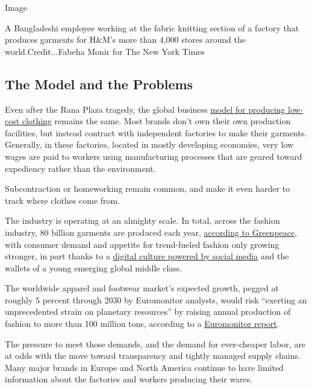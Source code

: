 Image

A Bangladeshi employee working at the fabric knitting section of a
factory that produces garments for H\&M's more than 4,000 stores around
the world.Credit...Fabeha Monir for The New York Times

\hypertarget{the-model-and-the-problems}{%
\subsection{The Model and the
Problems}\label{the-model-and-the-problems}}

Even after the Rana Plaza tragedy, the global business
\href{https://www.nytimes.com/2018/04/24/style/survivors-of-rana-plaza-disaster.html}{model
for producing low-cost clothing} remains the same. Most brands don't own
their own production facilities, but instead contract with independent
factories to make their garments. Generally, in these factories, located
in mostly developing economies, very low wages are paid to workers using
manufacturing processes that are geared toward expediency rather than
the environment.

Subcontraction or homeworking remain common, and make it even harder to
track where clothes come from.

The industry is operating at an almighty scale. In total, across the
fashion industry, 80 billion garments are produced each year,
\href{https://www.greenpeace.org/international/story/7539/fast-fashion-is-drowning-the-world-we-need-a-fashion-revolution/}{according
to Greenpeace}, with consumer demand and appetite for trend-fueled
fashion only growing stronger, in part thanks to a
\href{https://www.nytimes.com/2014/04/10/fashion/fashion-in-the-age-of-instagram.html}{digital
culture powered by social media} and the wallets of a young emerging
global middle class.

The worldwide apparel and footwear market's expected growth, pegged at
roughly 5 percent through 2030 by Euromonitor analysts, would risk
``exerting an unprecedented strain on planetary resources'' by raising
annual production of fashion to more than 100 million tons, according to
a
\href{https://fashinnovation.com/fashions-sustainability-push-isnt-keeping-up-with-growth/}{Euromonitor
report}.

The pressure to meet those demands, and the demand for ever-cheaper
labor, are at odds with the move toward transparency and tightly managed
supply chains. Many major brands in Europe and North America continue to
have limited information about the factories and workers producing their
wares.

